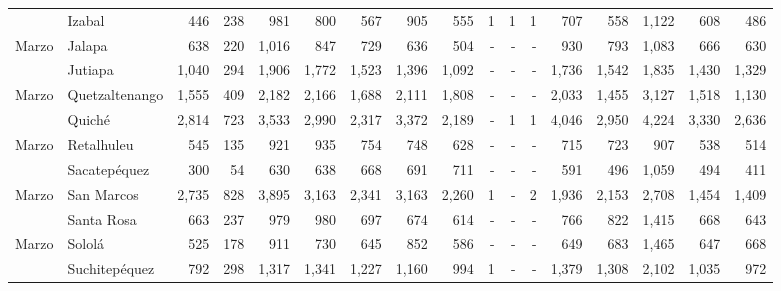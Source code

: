 \begin{landscape}
\begin{center}
\begin{longtable}{llrrrrrrrrrrrrrrr}
\rowcolor{color1!5!white}\multicolumn{1}{l}{	\footnotesize	 Marzo 	}&	 Izabal 	&	 446 	&	 238 	&	 981 	&	 800 	&	 567 	&	 905 	&	 555 	&	 1 	&	 1 	&	 1 	&	 707 	&	 558 	&	 1,122 	&	 608 	&	 486 	\\
\multicolumn{1}{l}{	\footnotesize	 Marzo 	}&	 Jalapa 	&	 638 	&	 220 	&	 1,016 	&	 847 	&	 729 	&	 636 	&	 504 	&	 -   	&	 -   	&	 -   	&	 930 	&	 793 	&	 1,083 	&	 666 	&	 630 	\\
\rowcolor{color1!5!white}\multicolumn{1}{l}{	\footnotesize	 Marzo 	}&	 Jutiapa 	&	 1,040 	&	 294 	&	 1,906 	&	 1,772 	&	 1,523 	&	 1,396 	&	 1,092 	&	 -   	&	 -   	&	 -   	&	 1,736 	&	 1,542 	&	 1,835 	&	 1,430 	&	 1,329 	\\
\multicolumn{1}{l}{	\footnotesize	 Marzo 	}&	 Quetzaltenango 	&	 1,555 	&	 409 	&	 2,182 	&	 2,166 	&	 1,688 	&	 2,111 	&	 1,808 	&	 -   	&	 -   	&	 -   	&	 2,033 	&	 1,455 	&	 3,127 	&	 1,518 	&	 1,130 	\\
\rowcolor{color1!5!white}\multicolumn{1}{l}{	\footnotesize	 Marzo 	}&	 Quiché 	&	 2,814 	&	 723 	&	 3,533 	&	 2,990 	&	 2,317 	&	 3,372 	&	 2,189 	&	 -   	&	 1 	&	 1 	&	 4,046 	&	 2,950 	&	 4,224 	&	 3,330 	&	 2,636 	\\
\multicolumn{1}{l}{	\footnotesize	 Marzo 	}&	 Retalhuleu 	&	 545 	&	 135 	&	 921 	&	 935 	&	 754 	&	 748 	&	 628 	&	 -   	&	 -   	&	 -   	&	 715 	&	 723 	&	 907 	&	 538 	&	 514 	\\
\rowcolor{color1!5!white}\multicolumn{1}{l}{	\footnotesize	 Marzo 	}&	 Sacatepéquez 	&	 300 	&	 54 	&	 630 	&	 638 	&	 668 	&	 691 	&	 711 	&	 -   	&	 -   	&	 -   	&	 591 	&	 496 	&	 1,059 	&	 494 	&	 411 	\\
\multicolumn{1}{l}{	\footnotesize	 Marzo 	}&	 San Marcos 	&	 2,735 	&	 828 	&	 3,895 	&	 3,163 	&	 2,341 	&	 3,163 	&	 2,260 	&	 1 	&	 -   	&	 2 	&	 1,936 	&	 2,153 	&	 2,708 	&	 1,454 	&	 1,409 	\\
\rowcolor{color1!5!white}\multicolumn{1}{l}{	\footnotesize	 Marzo 	}&	 Santa Rosa 	&	 663 	&	 237 	&	 979 	&	 980 	&	 697 	&	 674 	&	 614 	&	 -   	&	 -   	&	 -   	&	 766 	&	 822 	&	 1,415 	&	 668 	&	 643 	\\
\multicolumn{1}{l}{	\footnotesize	 Marzo 	}&	 Sololá 	&	 525 	&	 178 	&	 911 	&	 730 	&	 645 	&	 852 	&	 586 	&	 -   	&	 -   	&	 -   	&	 649 	&	 683 	&	 1,465 	&	 647 	&	 668 	\\
\rowcolor{color1!5!white}\multicolumn{1}{l}{	\footnotesize	 Marzo 	}&	 Suchitepéquez 	&	 792 	&	 298 	&	 1,317 	&	 1,341 	&	 1,227 	&	 1,160 	&	 994 	&	 1 	&	 -   	&	 -   	&	 1,379 	&	 1,308 	&	 2,102 	&	 1,035 	&	 972 	\\

\end{longtable}
\end{center}
\end{landscape}
